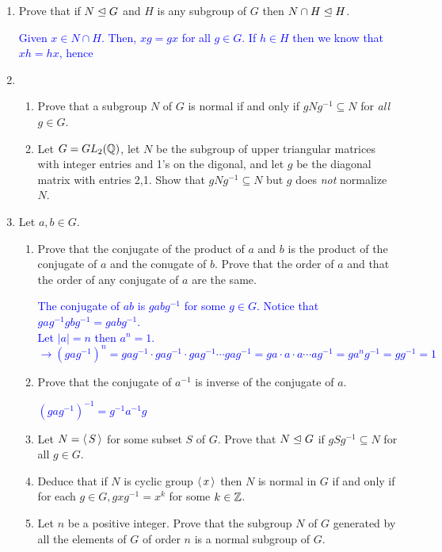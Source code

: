 \documentclass[10pt,a4paper]{report}
\newcommand{\BLUE}[1]{\textcolor{blue}{#1}}
\begin{document}
\begin{enumerate}
	\item Prove that if $N \trianglelefteq G$ and $H$ is any subgroup of $G$ then $N \cap H\trianglelefteq H$. 
	
	\BLUE{Given $x \in N \cap H$.  Then, $xg=gx$ for all $g\in G$.  If $h \in H$ then we know that $xh = hx$, hence 	
	}
	
	\item \begin{enumerate}
		\item Prove that a subgroup $N$ of $G$ is normal if and only if $gNg^{-1}\subseteq N$ for \textit{all} $g \in G$.
		
		\item Let $G=GL_2(\mathbb{Q})$, let $N$ be the subgroup of upper triangular matrices with integer entries and 1's on the digonal, and let $g$ be the diagonal matrix with entries 2,1.  Show that $gNg^{-1} \subseteq N$ but $g$ does \textit{not} normalize $N$.
	\end{enumerate}
	
	\item Let $a,b \in G$.
	\begin{enumerate}
		\item Prove that the conjugate of the product of $a$ and $b$ is the product of the conjugate of $a$ and the conugate of $b$.  Prove that the order of $a$ and that the order of any conjugate of $a$ are the same.
		
		\BLUE{The conjugate of $ab$ is $gabg^{-1}$ for some $g \in G$.  Notice that $gag^{-1}gbg^{-1}=gabg^{-1}$.\\
		Let $|a|=n$ then $a^n=1$.$\to (gag^{-1})^n=gag^{-1}\cdot gag^{-1}\cdot gag^{-1} \cdots gag^{-1} = ga\cdot a\cdot a \cdots ag^{-1}=ga^ng^{-1}=gg^{-1}=1$
		}
		
		\item Prove that the conjugate of $a^{-1}$ is inverse of the conjugate of $a$.
		
		\BLUE{$(gag^{-1})^{-1}=g^{-1}a^{-1}g$
		}
		
		\item Let $N = \left \langle\, S \,\right \rangle$ for some subset $S$ of $G$.  Prove that $N\trianglelefteq G$ if $gSg^{-1}\subseteq N$ for all $g \in G$.
		
		\item Deduce that if $N$ is cyclic group $\left \langle\, x \,\right \rangle$ then $N$ is normal in $G$ if and only if for each $g \in G, gxg^{-1}=x^k$ for some $k\in\mathbb{Z}$.
		\item Let $n$ be a positive integer. Prove that the subgroup $N$ of $G$ generated by all the elements of $G$ of order $n$ is a normal subgroup of $G$.
	\end{enumerate}
	

\end{enumerate}
\end{document}
